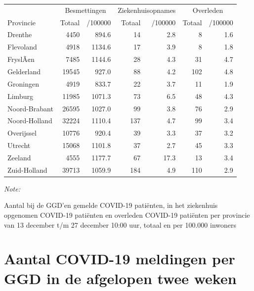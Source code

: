\documentclass[
  english,
  man,floatsintext]{apa6}
\begin{document}
\begin{table}
\centering
\begin{threeparttable}
\begin{tabular}{lrrrrrr}
\toprule
\multicolumn{1}{c}{ } & \multicolumn{2}{c}{Besmettingen} & \multicolumn{2}{c}{Ziekenhuisopnames} & \multicolumn{2}{c}{Overleden} \\
\cmidrule(l{3pt}r{3pt}){2-3} \cmidrule(l{3pt}r{3pt}){4-5} \cmidrule(l{3pt}r{3pt}){6-7}
Provincie & Totaal & /100000 & Totaal & /100000 & Totaal & /100000\\
\midrule
Drenthe & 4450 & 894.6 & 14 & 2.8 & 8 & 1.6\\
Flevoland & 4918 & 1134.6 & 17 & 3.9 & 8 & 1.8\\
FryslÃ¢n & 7485 & 1144.6 & 28 & 4.3 & 31 & 4.7\\
Gelderland & 19545 & 927.0 & 88 & 4.2 & 102 & 4.8\\
Groningen & 4919 & 833.7 & 22 & 3.7 & 11 & 1.9\\
Limburg & 11985 & 1071.3 & 73 & 6.5 & 48 & 4.3\\
Noord-Brabant & 26595 & 1027.0 & 99 & 3.8 & 76 & 2.9\\
Noord-Holland & 32224 & 1110.4 & 137 & 4.7 & 99 & 3.4\\
Overijssel & 10776 & 920.4 & 39 & 3.3 & 37 & 3.2\\
Utrecht & 15068 & 1101.8 & 37 & 2.7 & 45 & 3.3\\
Zeeland & 4555 & 1177.7 & 67 & 17.3 & 13 & 3.4\\
Zuid-Holland & 39713 & 1059.9 & 184 & 4.9 & 110 & 2.9\\
\bottomrule
\end{tabular}
\begin{tablenotes}
\item \textit{Note: } 
\item Aantal bij de GGD’en gemelde COVID-19 patiënten, in het ziekenhuis opgenomen COVID-19 patiënten en overleden COVID-19 patiënten per provincie van 13 december t/m 27 december 10:00 uur, totaal en per 100.000 inwoners
\end{tablenotes}
\end{threeparttable}
\end{table}

\newpage

\hypertarget{aantal-covid-19-meldingen-per-ggd-in-de-afgelopen-twee-weken}{%
\section{Aantal COVID-19 meldingen per GGD in de afgelopen twee weken}\label{aantal-covid-19-meldingen-per-ggd-in-de-afgelopen-twee-weken}}
\end{document}
